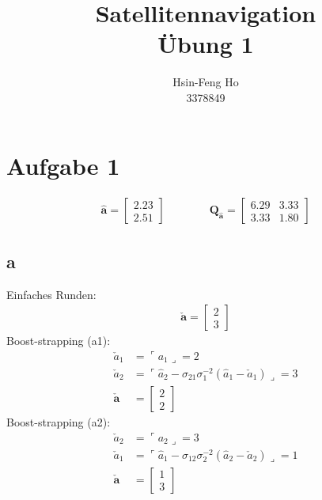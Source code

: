 \documentclass[12pt
,headinclude
,headsepline
,bibtotocnumbered
]{scrartcl}
\begin{document}
	\begin{titlepage}
		\vspace{\fill}
		\title{\textbf{Satellitennavigation \\ Übung 1}}
		\vspace{5cm}
		\author{Hsin-Feng Ho\\
			3378849}
		\vspace{3cm}
		\maketitle
	\end{titlepage}
	\section{Aufgabe 1}
	\begin{align*}
		\hat{\boldsymbol{a}}=\begin{bmatrix}
			2.23\\2.51
		\end{bmatrix}\qquad\qquad\boldsymbol{Q_{\hat{a}}}=\begin{bmatrix}
		6.29&3.33\\3.33&1.80
	\end{bmatrix}
	\end{align*}
	\subsection{a}
	Einfaches Runden:
	\begin{align*}
	\check{\boldsymbol{a}}=\begin{bmatrix}
		2\\3
	\end{bmatrix}
	\end{align*}
	Boost-strapping (a1):
	\begin{align*}
		\check{a}_1&=\ulcorner a_1 \lrcorner=2\\
		\check{a}_2&=\ulcorner \hat{a}_2-\sigma_{21}\sigma_1^{-2}\left( \hat{a}_1-\check{a}_1\right)  \lrcorner=3\\
			\check{\boldsymbol{a}}&=\begin{bmatrix}
			2\\2
		\end{bmatrix}
	\end{align*}
	Boost-strapping (a2):
\begin{align*}
	\check{a}_2&=\ulcorner a_2 \lrcorner=3\\
	\check{a}_1&=\ulcorner \hat{a}_1-\sigma_{12}\sigma_2^{-2}\left( \hat{a}_2-\check{a}_2\right)  \lrcorner=1\\
	\check{\boldsymbol{a}}&=\begin{bmatrix}
		1\\3
	\end{bmatrix}
\end{align*}
\end{document}
